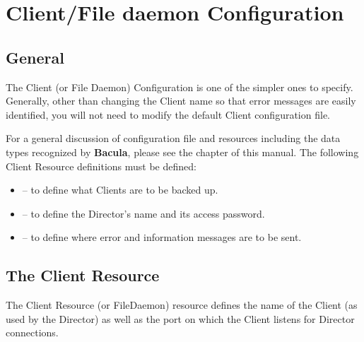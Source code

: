 
\section*{Client/File daemon Configuration}
\label{_ChapterStart25}

\subsection*{General}

The Client (or File Daemon) Configuration is one of the simpler ones to
specify. Generally, other than changing the Client name so that error messages
are easily identified, you will not need to modify the default Client
configuration file. 

For a general discussion of configuration file and resources including the
data types recognized by {\bf Bacula}, please see the 
 chapter of this manual. The
following Client Resource definitions must be defined: 

\begin{itemize}
\item 
    -- to define what Clients are  to
   be backed up.  
\item 
    -- to  define the Director's
   name and its access password.  
\item 
    -- to define where error  and
   information messages are to be sent. 
\end{itemize}

\subsection*{The Client Resource}
\label{ClientResource}

The Client Resource (or FileDaemon) resource defines the name of the Client
(as used by the Director) as well as the port on which the Client listens for
Director connections. 

